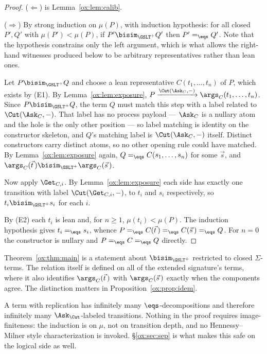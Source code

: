 \begin{proof}
($\Leftarrow$) is Lemma~\ref{ox:lem:calib}.

($\Rightarrow$) By strong induction on $\mu(P)$, with induction hypothesis: for all
closed $P',Q'$ with $\mu(P') < \mu(P)$, if $P' \bisim_{\GSLT^{+}} Q'$ then
$P' =_{\eqs} Q'$. Note that the hypothesis constrains only the left argument, which
is what allows the right-hand witnesses produced below to be arbitrary
representatives rather than lean ones.

Let $P \bisim_{\GSLT^{+}} Q$ and choose a lean representative $C(t_1,\dots,t_n)$ of
$P$, which exists by (E1). By Lemma~\ref{ox:lem:exposure},
$P \xrightarrow{\Cut(\Ask_C,-)} \args_C(t_1,\dots,t_n)$. Since
$P \bisim_{\GSLT^{+}} Q$, the term $Q$ must match this step with a label related to
$\Cut(\Ask_C,-)$. That label has no process payload --- $\Ask_C$ is a nullary atom
and the hole is the only other position --- so label matching is identity on the
constructor skeleton, and $Q$'s matching label is $\Cut(\Ask_C,-)$ itself. Distinct
constructors carry distinct atoms, so no other opening rule could have matched. By
Lemma~\ref{ox:lem:exposure} again, $Q =_{\eqs} C(s_1,\dots,s_n)$ for some $\vec s$,
and $\args_C(\vec t\,) \bisim_{\GSLT^{+}} \args_C(\vec s\,)$.

Now apply $\Get_{C,i}$. By Lemma~\ref{ox:lem:exposure} each side has exactly one
transition with label $\Cut(\Get_{C,i},-)$, to $t_i$ and $s_i$ respectively, so
$t_i \bisim_{\GSLT^{+}} s_i$ for each $i$.

By (E2) each $t_i$ is lean and, for $n \ge 1$, $\mu(t_i) < \mu(P)$. The induction
hypothesis gives $t_i =_{\eqs} s_i$, whence
$P =_{\eqs} C(\vec t\,) =_{\eqs} C(\vec s\,) =_{\eqs} Q$. For $n = 0$ the
constructor is nullary and $P =_{\eqs} C =_{\eqs} Q$ directly.
\end{proof}

\begin{remark}[Domains]
\label{ox:rem:domains}
Theorem~\ref{ox:thm:main} is a statement about $\bisim_{\GSLT^{+}}$ restricted to
closed $\Sigma$-terms. The relation itself is defined on all of the extended
signature's terms, where it also identifies $\args_C(\vec t\,)$ with
$\args_C(\vec s\,)$ exactly when the components agree. The distinction matters in
Proposition~\ref{ox:prop:idem}.
\end{remark}

\begin{remark}
\label{ox:rem:branching}
A term with replication has infinitely many $\eqs$-decompositions and therefore
infinitely many $\Ask_{\Cut}$-labeled transitions. Nothing in the proof requires
image-finiteness: the induction is on $\mu$, not on transition depth, and no
Hennessy--Milner style characterization is invoked. \S\ref{ox:sec:sep} is what
makes this safe on the logical side as well.
\end{remark}

